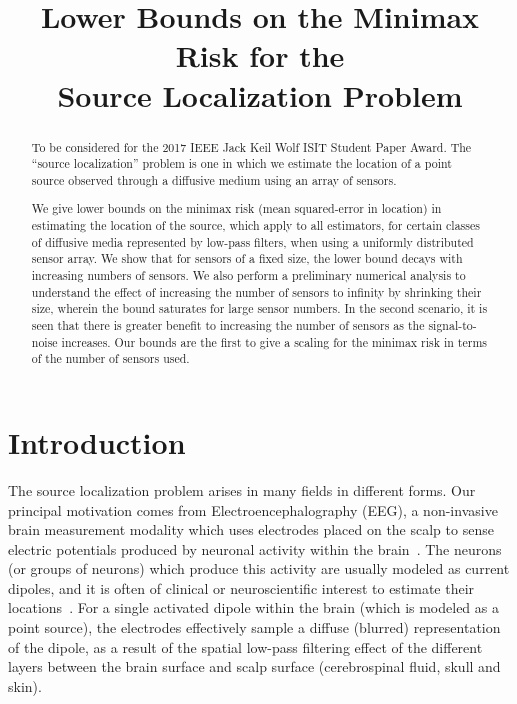 \documentclass[conference]{IEEEtran}
\title{Lower Bounds on the Minimax Risk for the \\ Source Localization Problem}
\author{
	\IEEEauthorblockN{
		Praveen Venkatesh (\href{mailto:vpraveen@cmu.edu}{\texttt{vpraveen@cmu.edu}}) %
		and Pulkit Grover (\href{mailto:pulkit@cmu.edu}{\texttt{pulkit@cmu.edu}}) %
	}
}
\begin{document}
\maketitle
\thispagestyle{plain}
\pagestyle{plain}

\begin{abstract}

To be considered for the 2017 IEEE Jack Keil Wolf ISIT Student Paper Award.
The ``source localization'' problem is one in which we estimate the location of
a point source observed through a diffusive medium using an array of sensors.

We give lower bounds on the minimax risk (mean squared-error in location) in
estimating the location of the source, which apply to all estimators, for
certain classes of diffusive media represented by low-pass
filters, when using a uniformly distributed sensor array. We show that
for sensors of a fixed size, the lower bound decays with
increasing numbers of sensors. We also perform a preliminary numerical analysis
to understand the effect of increasing the number of sensors to infinity by
shrinking their size, wherein the bound saturates for large sensor numbers.
In the second scenario, it is seen that there is greater
benefit to increasing the number of sensors as the signal-to-noise increases.
Our bounds are the first to give a scaling for the minimax risk in terms of the
number of sensors used.


\end{abstract}

\section{Introduction}

The source localization problem arises in many fields in different forms. Our
principal motivation comes from Electroencephalography (EEG), a non-invasive
brain measurement modality which uses electrodes placed on the scalp to sense
electric potentials produced by neuronal activity within the
brain~\cite{Nunez2006Electric}. The neurons (or groups of neurons) which
produce this activity are usually modeled as current dipoles, and it is often
of clinical or neuroscientific interest to estimate their
locations~\cite{Baillet2001Electromagnetic}. For a single activated dipole
within the brain (which is modeled as a point source), the electrodes
effectively sample a diffuse (blurred) representation of the dipole, as a
result of the spatial low-pass filtering effect of the different layers between
the brain surface and scalp surface (cerebrospinal fluid, skull and skin).
\end{document}

